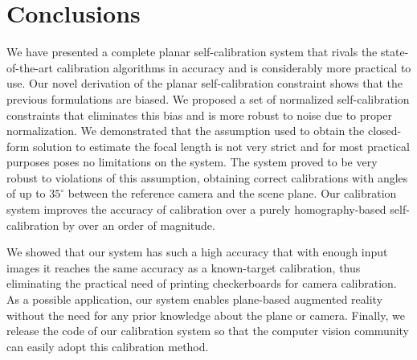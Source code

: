 \documentclass[10pt,twocolumn,letterpaper]{article}
\begin{document}
\section{Conclusions}

We have presented a complete planar self-calibration system that rivals the state-of-the-art calibration algorithms in accuracy and is considerably more practical to use. Our novel derivation of the planar self-calibration constraint shows that the previous formulations are biased. We proposed a set of normalized self-calibration constraints that eliminates this bias and is more robust to noise due to proper normalization. We demonstrated that the assumption used to obtain the closed-form solution to estimate the focal length is not very strict and for most practical purposes poses no limitations on the system. The system proved to be very robust to violations of this assumption, obtaining correct calibrations with angles of up to $35^\circ$ between the reference camera and the scene plane. Our calibration system improves the accuracy of calibration over a purely homography-based self-calibration by over an order of magnitude. 

We showed that our system has such a high accuracy that with enough input images it reaches the same accuracy as a known-target calibration, thus eliminating the practical need of printing checkerboards for camera calibration. As a possible application, our system enables plane-based augmented reality without the need for any prior knowledge about the plane or camera. Finally, we release the code of our calibration system so that the computer vision community can easily adopt this calibration method.

\clearpage

{\small


}
\end{document}

